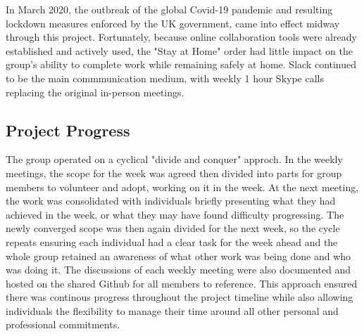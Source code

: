 \documentclass[10pt]{article}\usepackage[]{graphicx}\usepackage[]{color}
\begin{document}
In March 2020, the outbreak of the global Covid-19 pandemic and resulting lockdown measures enforced by the UK government, came into effect midway through this project. Fortunately, because online collaboration tools were already established and actively used, the "Stay at Home" order had little impact on the group's ability to complete work while remaining safely at home. Slack continued to be the main commmunication medium, with weekly 1 hour Skype calls replacing the original in-person meetings.\\


\subsection{Project Progress}

The group operated on a cyclical "divide and conquer" approch. In the weekly meetings, the scope for the week was agreed then divided into parts for group members to volunteer and adopt, working on it in the week. At the next meeting, the work was consolidated with individuals briefly presenting what they had achieved in the week, or what they may have found difficulty progressing. The newly converged scope was then again divided for the next week, so the cycle repeats ensuring each individual had a clear task for the week ahead and the whole group retained an awareness of what other work was being done and who was doing it. The discussions of each weekly meeting were also documented and hosted on the shared Github for all members to reference. This approach ensured there was continous progress throughout the project timeline while also allowing individuals the flexibility to manage their time around all other personal and professional commitments. \\
\end{document}
